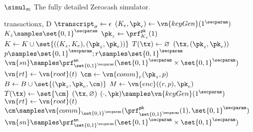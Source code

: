 \begin{simulator}{$\simul_{\mathsf{zc}}$}
  The fully detailed Zerocash simulator.
  
  \begin{statedecl}
  \end{statedecl}

  \begin{receive}{transaction}{x, D}
      \State \Let $\transcript_\sigma \gets \epsilon$
      \State \Let $(K_e, \pk_e) \gets \vn{keyGen}(1^\secparam)$
      \State \Let $K_z \samples \set{0,1}^\secparam$
      \State \Let $\pk_z \gets \prf_{K_z}^{\mathsf{pk}}(1)$
      \State \Let $K \gets K \cup \set{((K_z, K_e), (\pk_z, \pk_e))}$
      \State \Let $T(\tx) \gets \varnothing$
      \State \Return $(\tx, (\pk_z, \pk_e))$
      \State \Let $p \samples \set{0,1}^\secparam; r \samples \set{0,1}^\secparam$
      \State \Let $\vn{sn} \samples
        \prf_{\set{0,1}^\secparam}^{\mathsf{sn}}(\set{0,1}^\secparam \times
        \set{0,1}^\secparam)$
      \State \Let $\vn{rt} \gets \vn{root}(t)$
      \State \Let $\cm \gets \vn{comm}_r(\pk_z, p)$
      \State \Let $B \gets B \cup \set{(\pk_z, \pk_e, \cm)}$
      \State \Let $M \gets \vn{enc}((r, p), \pk_e)$
      \State \Let $T(\tx) \gets \set{\cm}$
      \State \Return $(\tx, \varnothing)$
      \State \Let $(\cdot, \pk) \samples \vn{keyGen}(1^\secparam)$
      \State \Let $\vn{rt} \gets \vn{root}(t)$
      \State \Let $\cm \samples
        \vn{comm}_{\set{0,1}^\secparam}(\prf_{\set{0,1}^\secparam}^{\mathsf{pk}}(1),
        \set{0,1}^\secparam)$
      \State \Let $\vn{sn} \samples
        \prf_{\set{0,1}^\secparam}^{\mathsf{sn}}(\set{0,1}^\secparam \times
        \set{0,1}^\secparam)$

\end{receive}
\end{simulator}
